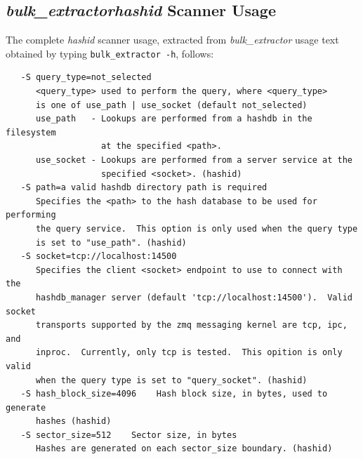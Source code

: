 \documentclass[11pt,twoside]{article}
\newcommand \bulk {\textit{bulk\_extractor}\xspace}
\newcommand \hid {\textit{hashid}\xspace}
\begin{document}
\subsection{\bulk \hid Scanner Usage\label{hid-usage}}
The complete \hid scanner usage,
extracted from \bulk usage text obtained
by typing \texttt{bulk\_extractor -h}, follows:
\begin{small}
\begin{verbatim}
   -S query_type=not_selected    
      <query_type> used to perform the query, where <query_type>
      is one of use_path | use_socket (default not_selected)
      use_path   - Lookups are performed from a hashdb in the filesystem
                   at the specified <path>.
      use_socket - Lookups are performed from a server service at the
                   specified <socket>. (hashid)
   -S path=a valid hashdb directory path is required    
      Specifies the <path> to the hash database to be used for performing
      the query service.  This option is only used when the query type
      is set to "use_path". (hashid)
   -S socket=tcp://localhost:14500    
      Specifies the client <socket> endpoint to use to connect with the
      hashdb_manager server (default 'tcp://localhost:14500').  Valid socket
      transports supported by the zmq messaging kernel are tcp, ipc, and
      inproc.  Currently, only tcp is tested.  This opition is only valid
      when the query type is set to "query_socket". (hashid)
   -S hash_block_size=4096    Hash block size, in bytes, used to generate
      hashes (hashid)
   -S sector_size=512    Sector size, in bytes
      Hashes are generated on each sector_size boundary. (hashid)
\end{verbatim}
\end{small}
\end{document}
